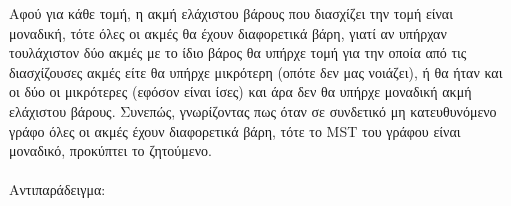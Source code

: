 \documentclass[12pt,a4paper]{article}
\begin{document}
  Αφού για κάθε τομή, η ακμή ελάχιστου βάρους που διασχίζει την τομή είναι
  μοναδική, τότε όλες οι ακμές θα έχουν διαφορετικά βάρη, γιατί αν υπήρχαν
  τουλάχιστον δύο ακμές με το ίδιο βάρος θα υπήρχε τομή για την οποία από
  τις διασχίζουσες ακμές είτε θα υπήρχε μικρότερη (οπότε δεν μας νοιάζει), ή
  θα ήταν και οι δύο οι μικρότερες (εφόσον είναι ίσες) και άρα δεν θα υπήρχε
  μοναδική ακμή ελάχιστου βάρους. Συνεπώς, γνωρίζοντας πως όταν σε συνδετικό μη
  κατευθυνόμενο γράφο όλες οι ακμές έχουν διαφορετικά βάρη, τότε το
  {\latintext MST} του γράφου είναι μοναδικό, προκύπτει το ζητούμενο.
  \\
  \\
  Αντιπαράδειγμα:
  \\
  \begin{center}
    
  \end{center}
\end{document}
